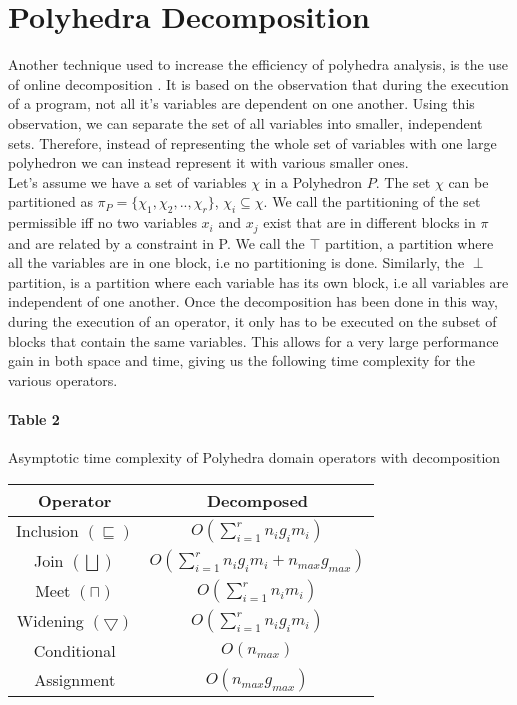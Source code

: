  \section{Polyhedra Decomposition}
Another technique used to increase the efficiency of polyhedra analysis, is the use of online decomposition \cite{singh2017fast}. It is based on the observation that during the execution of a program, not all it's variables are dependent on one another. Using this observation, we can separate the set of all variables into smaller, independent sets. Therefore, instead of representing the whole set of variables with one large polyhedron we can instead represent it with various smaller ones.\\ Let's assume we have a set of variables $\chi$ in a Polyhedron $P$. The set $\chi$ can be partitioned as $\pi_P=\{ \chi_1,\chi_2,..,\chi_r\}$, $\chi_i\subseteq\chi $. We call the partitioning of the set permissible iff no two variables $x_i$ and $x_j$ exist that are in different blocks in $\pi$ and are related by a constraint in P. We call the $\top$ partition, a partition where all the variables are in one block, i.e no partitioning is done. Similarly, the $\perp$ partition, is a partition where each variable has its own block, i.e all variables are independent of one another. Once the decomposition has been done in this way, during the execution of an operator, it only has to be executed on the subset of blocks that contain the same variables. This allows for a very large performance gain in both space and time, giving us the following time complexity for the various operators.

\paragraph{Table 2} Asymptotic time complexity of Polyhedra domain operators with decomposition

\begin{center}
\begin{tabular}{||c c||} 
 
 \hline
 Operator & Decomposed  \\ [0.5ex] 
 \hline
 Inclusion $(\sqsubseteq)$ & $O(\sum_{i=1}^r n_ig_im_i)$\\ 
 \hline
 Join $(\bigsqcup)$ & $O(\sum_{i=1}^r n_i g_i m_i + n_{max} g_{max})$ \\
 \hline
 Meet $(\sqcap)$ & $O(\sum_{i=1}^r n_i m_i)$ \\
 \hline
 Widening $(\bigtriangledown)$ & $O(\sum_{i=1}^r n_i g_i m_i)$\\
 \hline
 Conditional & $O(n_{max})$ \\ 
 \hline
 Assignment & $O(n_{max}g_{max})$ \\ 
 
 
 \hline
\end{tabular}
\end{center}


